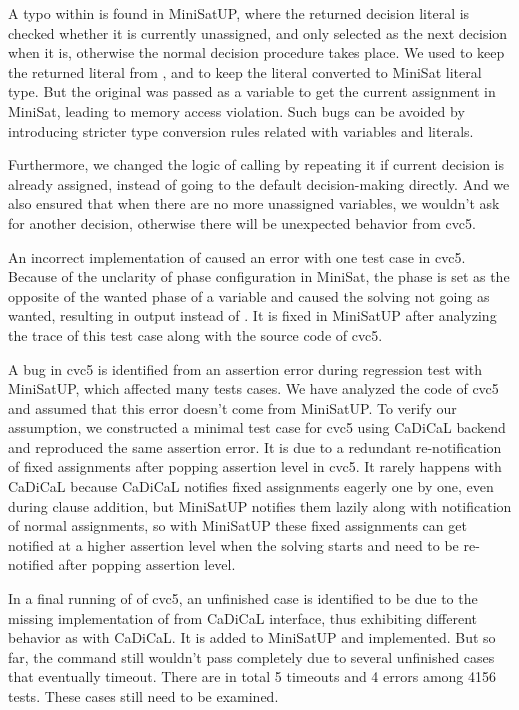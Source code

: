 A typo within  is found in MiniSatUP, where the returned decision literal is checked whether it is currently unassigned, and only selected as the next decision when it is, otherwise the normal decision procedure takes place. We used  to keep the returned literal from , and  to keep the literal converted to MiniSat literal type. But the original  was passed as a variable to get the current assignment in MiniSat, leading to memory access violation. Such bugs can be avoided by introducing stricter type conversion rules related with variables and literals.

Furthermore, we changed the logic of calling  by repeating it if current decision is already assigned, instead of going to the default decision-making directly. And we also ensured that when there are no more unassigned variables, we wouldn't ask for another decision, otherwise there will be unexpected behavior from cvc5.

An incorrect implementation of  caused an error with one test case in cvc5. Because of the unclarity of phase configuration in MiniSat, the phase is set as the opposite of the wanted phase of a variable and caused the solving not going as wanted, resulting in  output instead of . It is fixed in MiniSatUP after analyzing the trace of this test case along with the source code of cvc5.

A bug in cvc5 is identified from an assertion error during regression test with MiniSatUP, which affected many tests cases. We have analyzed the code of cvc5 and assumed that this error doesn't come from MiniSatUP. To verify our assumption, we constructed a minimal test case for cvc5 using CaDiCaL backend and reproduced the same assertion error. It is due to a redundant re-notification of fixed assignments after popping assertion level in cvc5. It rarely happens with CaDiCaL because CaDiCaL notifies fixed assignments eagerly one by one, even during clause addition, but MiniSatUP notifies them lazily along with notification of normal assignments, so with MiniSatUP these fixed assignments can get notified at a higher assertion level when the solving starts and need to be re-notified after popping assertion level.

In a final running of  of cvc5, an unfinished case is identified to be due to the missing implementation of  from CaDiCaL interface, thus exhibiting different behavior as with CaDiCaL. It is added to MiniSatUP and implemented. But so far, the  command still wouldn't pass completely due to several unfinished cases that eventually timeout. There are in total 5 timeouts and 4 errors among 4156 tests. These cases still need to be examined.

